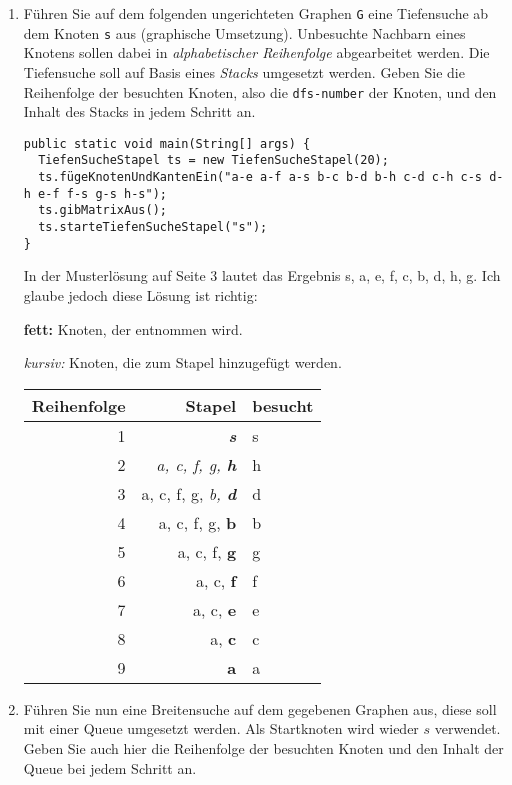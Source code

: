 \documentclass{lehramt-informatik-haupt}
\begin{document}
\begin{enumerate}


\item Führen Sie auf dem folgenden ungerichteten Graphen \texttt{G} eine
Tiefensuche ab dem Knoten \texttt{s} aus (graphische Umsetzung).
Unbesuchte Nachbarn eines Knotens sollen dabei in \emph{alphabetischer
Reihenfolge} abgearbeitet werden. Die Tiefensuche soll auf Basis eines
\emph{Stacks} umgesetzt werden. Geben Sie die Reihenfolge der besuchten
Knoten, also die \texttt{dfs-number} der Knoten, und den Inhalt des
Stacks in jedem Schritt an.

\begin{verbatim}
public static void main(String[] args) {
  TiefenSucheStapel ts = new TiefenSucheStapel(20);
  ts.fügeKnotenUndKantenEin("a-e a-f a-s b-c b-d b-h c-d c-h c-s d-h e-f f-s g-s h-s");
  ts.gibMatrixAus();
  ts.starteTiefenSucheStapel("s");
}
\end{verbatim}

\begin{antwort}
In der Musterlösung auf Seite 3 lautet das Ergebnis s, a, e, f, c, b, d, h, g.
Ich glaube jedoch diese Lösung ist richtig:

\textbf{fett:} Knoten, der entnommen wird.

\textit{kursiv:} Knoten, die zum Stapel hinzugefügt werden.

\begin{tabular}{|r|r|l|}
\hline
\textbf{Reihenfolge} & \textbf{Stapel} & \textbf{besucht} \\\hline\hline
1 & \textit{\textbf{s}} & s \\\hline
2 & \textit{a, c, f, g, \textbf{h}} & h \\\hline
3 & a, c, f, g, \textit{b, \textbf{d}} & d \\\hline
4 & a, c, f, g, \textbf{b} & b \\\hline
5 & a, c, f, \textbf{g} & g \\\hline
6 & a, c, \textbf{f} & f \\\hline
7 & a, c, \textbf{e} & e \\\hline
8 & a, \textbf{c} & c \\\hline
9 & \textbf{a} & a \\\hline
\end{tabular}
\end{antwort}


\item Führen Sie nun eine Breitensuche auf dem gegebenen Graphen aus,
diese soll mit einer Queue umgesetzt werden. Als Startknoten wird wieder
$s$ verwendet. Geben Sie auch hier die Reihenfolge der besuchten Knoten
und den Inhalt der Queue bei jedem Schritt an.


\end{enumerate}
\end{document}
